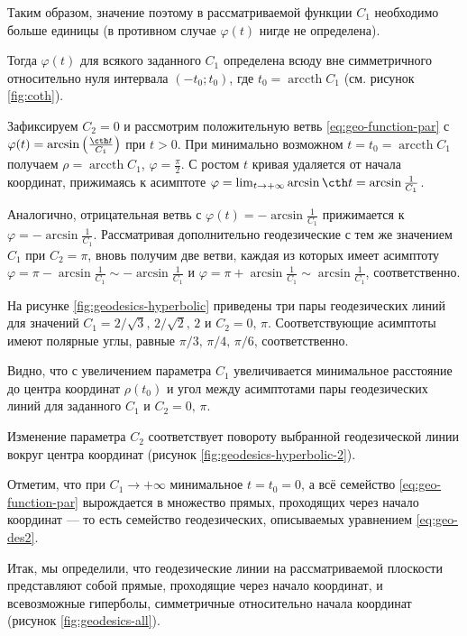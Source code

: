 \documentclass{article}
\numberwithin{equation}{section}
\renewcommand{\phi}{\varphi}
\DeclareMathOperator{\arccth}{arccth}
\begin{document}
Таким образом, значение поэтому в рассматриваемой функции $C_1$
необходимо больше единицы (в противном случае $\phi(t)$ нигде не
определена).

Тогда $\phi(t)$ для всякого заданного $C_1$ определена всюду вне
симметричного относительно нуля интервала $(-t_0;t_0)$, где $t_0 =
\arccth{C_1}$ (см. рисунок \ref{fig:coth}).

Зафиксируем $C_2 = 0$ и рассмотрим положительную ветвь
\eqref{eq:geo-function-par} с $\phi(t) = \arcsin\left(\frac{\cth
    t}{C_1}\right)$ при $t>0$. При минимально возможном $t = t_0 =
\arccth{C_1}$ получаем $\rho = \arccth{C_1}$, $\phi = \frac{\pi}{2}$. С ростом
$t$ кривая удаляется от начала координат, прижимаясь к асимптоте
$\phi = \lim_{t \to +\infty} \arcsin{\cth t} = \arcsin{\frac{1}{C_1}}$.

Аналогично, отрицательная ветвь с $\phi(t) = -\arcsin\frac{1}{C_1}$
прижимается к $\phi = -\arcsin{\frac{1}{C_1}}$. Рассматривая
дополнительно геодезические с тем же значением $C_1$ при $C_2 = \pi$,
вновь получим две ветви, каждая из которых имеет асимптоту $\phi =
\pi-\arcsin\frac{1}{C_1} \sim -\arcsin\frac{1}{C_1}$ и $\phi =
\pi+\arcsin\frac{1}{C_1} \sim \arcsin\frac{1}{C_1}$, соответственно.



На рисунке \ref{fig:geodesics-hyperbolic} приведены три пары
геодезических линий для значений $C_1=2/\sqrt{3},\,2/\sqrt{2},\,2$ и
$C_2=0,\,\pi$. Соответствующие асимптоты имеют полярные углы, равные
$\pi/3,\,\pi/4,\,\pi/6$, соответственно.

Видно, что с увеличением параметра $C_1$ увеличивается минимальное
расстояние до центра координат $\rho(t_0)$ и угол между асимптотами
пары геодезических линий для заданного $C_1$ и $C_2=0,\,\pi$.

Изменение параметра $C_2$ соответствует повороту выбранной
геодезической линии вокруг центра координат (рисунок
\ref{fig:geodesics-hyperbolic-2}).



Отметим, что при $C_1 \to +\infty$ минимальное $t= t_0 = 0$, а всё
семейство \eqref{eq:geo-function-par} вырождается в множество прямых,
проходящих через начало координат — то есть семейство геодезических,
описываемых уравнением \eqref{eq:geo-des2}.

Итак, мы определили, что геодезические линии на рассматриваемой
плоскости представляют собой прямые, проходящие через начало
координат, и всевозможные гиперболы, симметричные относительно начала
координат (рисунок \ref{fig:geodesics-all}).
\end{document}
